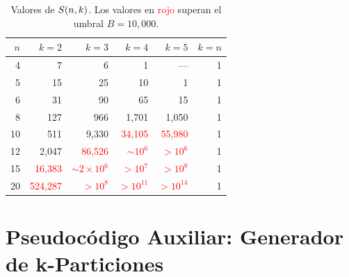 \begin{table}[H]
    \centering
    \caption{Valores de $\Stirling{n}{k}$. Los valores en \textcolor{red}{rojo} superan el umbral $B=10{,}000$.}
    \label{tab:stirling_full}
    \begin{tabular}{rrrrrr}
        \toprule
        $n$ & $k=2$ & $k=3$ & $k=4$ & $k=5$ & $k=n$ \\
        \midrule
        4  & 7          & 6           & 1              & ---       & 1 \\
        5  & 15         & 25          & 10             & 1         & 1 \\
        6  & 31         & 90          & 65             & 15        & 1 \\
        8  & 127        & 966         & 1{,}701        & 1{,}050   & 1 \\
        10 & 511        & 9{,}330     & \textcolor{red}{34{,}105}  & \textcolor{red}{55{,}980}  & 1 \\
        12 & 2{,}047    & \textcolor{red}{86{,}526}     & \textcolor{red}{$\sim 10^6$} & \textcolor{red}{$>10^6$}   & 1 \\
        15 & \textcolor{red}{16{,}383} & \textcolor{red}{$\sim 2\times10^6$} & \textcolor{red}{$>10^7$} & \textcolor{red}{$>10^8$} & 1 \\
        20 & \textcolor{red}{524{,}287} & \textcolor{red}{$>10^8$} & \textcolor{red}{$>10^{11}$} & \textcolor{red}{$>10^{14}$} & 1 \\
        \bottomrule
    \end{tabular}
\end{table}

\section{Pseudocódigo Auxiliar: Generador de k-Particiones}
\label{ap:generar}

\begin{algorithm}[H]
\DontPrintSemicolon
{}
\BlankLine
{}
\caption{\_generar\_particiones: backtracking recursivo para $\Stirling{n}{k}$ particiones.}
\label{alg:generar}
\end{algorithm}

